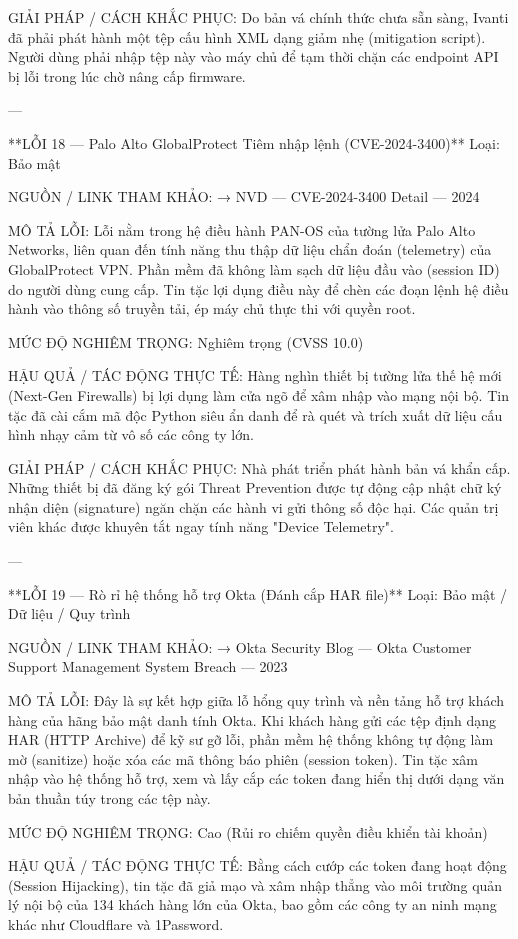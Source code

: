GIẢI PHÁP / CÁCH KHẮC PHỤC:
Do bản vá chính thức chưa sẵn sàng, Ivanti đã phải phát hành một tệp cấu hình XML dạng giảm nhẹ (mitigation script). Người dùng phải nhập tệp này vào máy chủ để tạm thời chặn các endpoint API bị lỗi trong lúc chờ nâng cấp firmware.

---

**LỖI 18 — Palo Alto GlobalProtect Tiêm nhập lệnh (CVE-2024-3400)**
Loại: Bảo mật

NGUỒN / LINK THAM KHẢO:
→ NVD — CVE-2024-3400 Detail — 2024

MÔ TẢ LỖI:
Lỗi nằm trong hệ điều hành PAN-OS của tường lửa Palo Alto Networks, liên quan đến tính năng thu thập dữ liệu chẩn đoán (telemetry) của GlobalProtect VPN. Phần mềm đã không làm sạch dữ liệu đầu vào (session ID) do người dùng cung cấp. Tin tặc lợi dụng điều này để chèn các đoạn lệnh hệ điều hành vào thông số truyền tải, ép máy chủ thực thi với quyền root.

MỨC ĐỘ NGHIÊM TRỌNG:
Nghiêm trọng (CVSS 10.0)

HẬU QUẢ / TÁC ĐỘNG THỰC TẾ:
Hàng nghìn thiết bị tường lửa thế hệ mới (Next-Gen Firewalls) bị lợi dụng làm cửa ngõ để xâm nhập vào mạng nội bộ. Tin tặc đã cài cắm mã độc Python siêu ẩn danh để rà quét và trích xuất dữ liệu cấu hình nhạy cảm từ vô số các công ty lớn.

GIẢI PHÁP / CÁCH KHẮC PHỤC:
Nhà phát triển phát hành bản vá khẩn cấp. Những thiết bị đã đăng ký gói Threat Prevention được tự động cập nhật chữ ký nhận diện (signature) ngăn chặn các hành vi gửi thông số độc hại. Các quản trị viên khác được khuyên tắt ngay tính năng "Device Telemetry".

---

**LỖI 19 — Rò rỉ hệ thống hỗ trợ Okta (Đánh cắp HAR file)**
Loại: Bảo mật / Dữ liệu / Quy trình

NGUỒN / LINK THAM KHẢO:
→ Okta Security Blog — Okta Customer Support Management System Breach — 2023

MÔ TẢ LỖI:
Đây là sự kết hợp giữa lỗ hổng quy trình và nền tảng hỗ trợ khách hàng của hãng bảo mật danh tính Okta. Khi khách hàng gửi các tệp định dạng HAR (HTTP Archive) để kỹ sư gỡ lỗi, phần mềm hệ thống không tự động làm mờ (sanitize) hoặc xóa các mã thông báo phiên (session token). Tin tặc xâm nhập vào hệ thống hỗ trợ, xem và lấy cắp các token đang hiển thị dưới dạng văn bản thuần túy trong các tệp này.

MỨC ĐỘ NGHIÊM TRỌNG:
Cao (Rủi ro chiếm quyền điều khiển tài khoản)

HẬU QUẢ / TÁC ĐỘNG THỰC TẾ:
Bằng cách cướp các token đang hoạt động (Session Hijacking), tin tặc đã giả mạo và xâm nhập thẳng vào môi trường quản lý nội bộ của 134 khách hàng lớn của Okta, bao gồm các công ty an ninh mạng khác như Cloudflare và 1Password.

